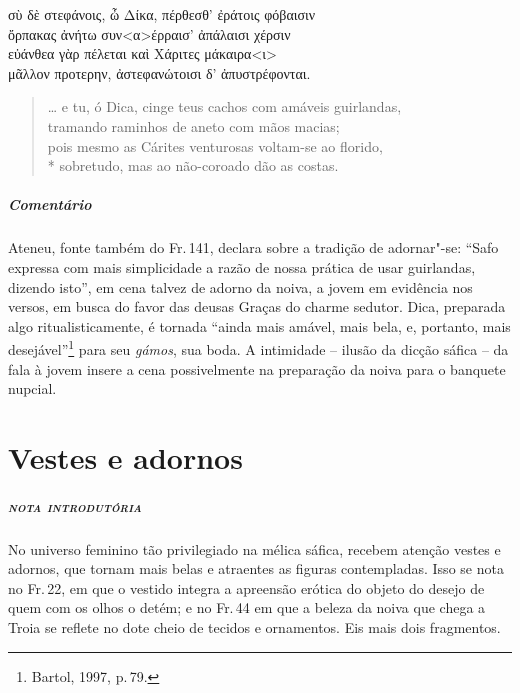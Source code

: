 {\begin{gkverse}
σὺ δὲ στεφάνοις, ὦ Δίκα, πέρθεσθ’ ἐράτοις φόβαισιν\\
ὄρπακας ἀνήτω συν<α>έρραισ’ ἀπάλαισι χέρσιν\\
εὐάνθεα \dagger{}γὰρ πέλεται\dagger{} καὶ Χάριτες μάκαιρα<ι>\\
μᾶλλον \dagger{}προτερην\dagger{}, ἀστεφανώτοισι δ’ ἀπυστρέφονται.
\end{gkverse}

\begin{verse}
\ldots{} e tu, ó Dica, cinge teus cachos com amáveis guirlandas,\\
tramando raminhos de aneto com mãos macias;\\
pois mesmo as Cárites venturosas voltam-se ao florido,\\*
sobretudo, mas ao não-coroado dão as costas.
\end{verse}

\medskip

{\paragraph{Comentário} Ateneu, fonte também do Fr.\,141, declara sobre a tradição de adornar"-se:
``Safo expressa com mais simplicidade a razão de nossa prática
de usar guirlandas, dizendo isto'', em cena talvez de adorno da noiva, a jovem em evidência nos versos, em busca do favor das deusas Graças do charme sedutor.
Dica, preparada algo ritualisticamente, é tornada ``ainda mais amável, mais bela, e, portanto, mais desejável''\footnote{Bartol, 1997, p.\,79.} para seu \textit{gámos}, sua boda. A intimidade -- ilusão da dicção sáfica -- da fala à jovem insere a cena possivelmente na preparação da noiva para o banquete nupcial.}


\chapter{Vestes e adornos}

\paragraph{\textsc{nota introdutória}}
No universo feminino tão privilegiado na mélica sáfica, recebem atenção vestes e
adornos, que tornam mais belas e atraentes as figuras contempladas. Isso se
nota no Fr.\,22, em que o vestido integra a apreensão erótica do objeto do
desejo de quem com os olhos o detém; e no Fr.\,44 em que a beleza da noiva que chega a
Troia se reflete no dote cheio de tecidos e ornamentos. Eis mais dois fragmentos.


}
